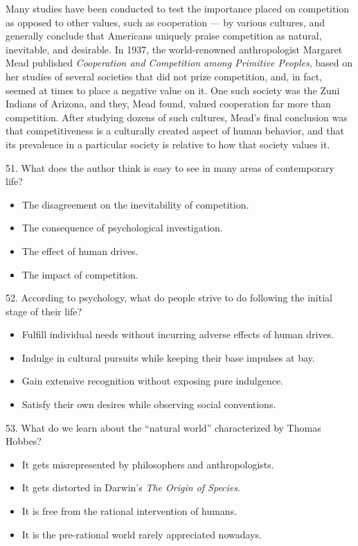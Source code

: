 \documentclass[UTF8,11pt]{ctexart}
\begin{document}
Many studies have been conducted to test the importance placed on competition as opposed to other values, such as cooperation — by various cultures, and generally conclude that Americans uniquely praise competition as natural, inevitable, and desirable. In 1937, the world-renowned anthropologist Margaret Mead published \textit{Cooperation and Competition among Primitive Peoples}, based on her studies of several societies that did not prize competition, and, in fact, seemed at times to place a negative value on it. One such society was the Zuni Indians of Arizona, and they, Mead found, valued cooperation far more than competition. After studying dozens of such cultures, Mead’s final conclusion was that competitiveness is a culturally created aspect of human behavior, and that its prevalence in a particular society is relative to how that society values it.


51. What does the author think is easy to see in many areas of contemporary life?


\begin{itemize}[leftmargin=2em,itemsep=.2em,topsep=.4em]\item[A.] The disagreement on the inevitability of competition.
\item[B.] The consequence of psychological investigation.
\item[C.] The effect of human drives.
\item[D.] The impact of competition.
\end{itemize}

52. According to psychology, what do people strive to do following the initial stage of their life?


\begin{itemize}[leftmargin=2em,itemsep=.2em,topsep=.4em]\item[A.] Fulfill individual needs without incurring adverse effects of human drives.
\item[B.] Indulge in cultural pursuits while keeping their base impulses at bay.
\item[C.] Gain extensive recognition without exposing pure indulgence.
\item[D.] Satisfy their own desires while observing social conventions.
\end{itemize}

53. What do we learn about the “natural world” characterized by Thomas Hobbes?


\begin{itemize}[leftmargin=2em,itemsep=.2em,topsep=.4em]\item[A.] It gets misrepresented by philosophers and anthropologists.
\item[B.] It gets distorted in Darwin’s \textit{The Origin of Species}.
\item[C.] It is free from the rational intervention of humans.
\item[D.] It is the pre-rational world rarely appreciated nowadays.
\end{itemize}
\end{document}
